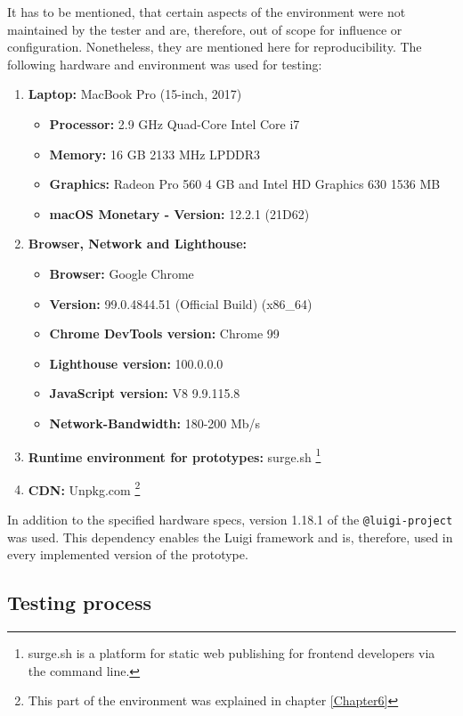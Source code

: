 It has to be mentioned, that certain aspects of the environment were not maintained by the tester and are, therefore, out of scope for influence or configuration. Nonetheless, they are mentioned here for reproducibility.
The following hardware and environment was used for testing:
\begin{enumerate}[noitemsep]
	\item \textbf{Laptop:} MacBook Pro (15-inch, 2017)
	\begin{itemize}[noitemsep]
		\item \textbf{Processor:} 2.9 GHz Quad-Core Intel Core i7
		\item \textbf{Memory:} 16 GB 2133 MHz LPDDR3 
		\item \textbf{Graphics:} Radeon Pro 560 4 GB and Intel HD Graphics 630 1536 MB
		\item \textbf{macOS Monetary - Version:} 12.2.1 (21D62)
	\end{itemize} 
	
	\item \textbf{Browser, Network and Lighthouse:}
	\begin{itemize}[noitemsep]
		\item \textbf{Browser:} Google Chrome
		\item \textbf{Version:} 99.0.4844.51 (Official Build) (x86\_64)
		\item \textbf{Chrome DevTools version:} Chrome 99
		\item \textbf{Lighthouse version:} 100.0.0.0
		\item \textbf{JavaScript version:} V8 9.9.115.8
		\item \textbf{Network-Bandwidth:} 180-200 Mb/s
	\end{itemize}
	
	\item \textbf{Runtime environment for prototypes:} surge.sh \footnote{surge.sh is a platform for static web publishing
		for frontend developers via the command line.}
	
	\item \textbf{CDN:} Unpkg.com \footnote{This part of the environment was explained in chapter \ref{Chapter6}}
\end{enumerate}

In addition to the specified hardware specs, version 1.18.1 of the \texttt{@luigi-project} was used. This dependency enables the Luigi framework and is, therefore, used in every implemented version of the prototype.

\subsection{Testing process}

